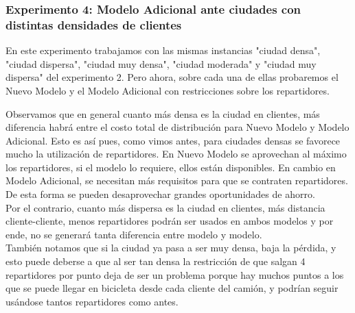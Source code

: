 \documentclass{article}
\begin{document}
    \subsubsection{Experimento 4: Modelo Adicional ante ciudades con distintas densidades de clientes}

    En este experimento trabajamos con las mismas instancias "ciudad densa", "ciudad dispersa", "ciudad muy densa", "ciudad moderada" y "ciudad muy dispersa" del experimento 2. Pero ahora, sobre cada una de ellas probaremos el Nuevo Modelo y el Modelo Adicional con restricciones sobre los repartidores.

    \begin{table}[H]
    \centering
    \caption{Comparación de costos entre metodologías para distintas densidades de clientes por $km^{2}$}
    \end{table}

    Observamos que en general cuanto más densa es la ciudad en clientes, más diferencia habrá entre el costo total de distribución para Nuevo Modelo y Modelo Adicional. Esto es así pues, como vimos antes, para ciudades densas se favorece mucho la utilización de repartidores. En Nuevo Modelo se aprovechan al máximo los repartidores, si el modelo lo requiere, ellos están disponibles. En cambio en Modelo Adicional, se necesitan más requisitos para que se contraten repartidores. De esta forma se pueden desaprovechar grandes oportunidades de ahorro. \\
    Por el contrario, cuanto más dispersa es la ciudad en clientes, más distancia cliente-cliente, menos repartidores podrán ser usados en ambos modelos y por ende, no se generará tanta diferencia entre modelo y modelo. \\
    También notamos que si la ciudad ya pasa a ser muy densa, baja la pérdida, y esto puede deberse a que al ser tan densa la restricción de que salgan 4 repartidores por punto deja de ser un problema porque hay muchos puntos a los que se puede llegar en bicicleta desde cada cliente del camión, y podrían seguir usándose tantos repartidores como antes.
\end{document}
